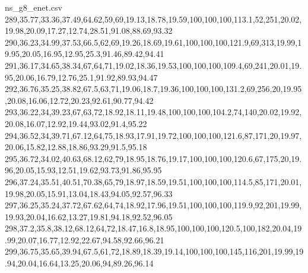 \begin{filecontents*}[overwrite]{ns_g8_enet.csv}
289,35.77,33.36,37.49,64.62,59,69,19.13,18.78,19.59,100,100,100,113.1,52,251,20.02,19.98,20.09,17.27,12.74,28.51,91.08,88.69,93.32
290,36.23,34.99,37.53,66.5,62,69,19.26,18.69,19.61,100,100,100,121.9,69,313,19.99,19.95,20.05,16.95,12.95,25.3,91.46,89.42,94.41
291,36.17,34.65,38.34,67,64,71,19.02,18.36,19.53,100,100,100,109.4,69,241,20.01,19.95,20.06,16.79,12.76,25.1,91.92,89.93,94.47
292,36.76,35.25,38.82,67.5,63,71,19.06,18.7,19.36,100,100,100,131.2,69,256,20,19.95,20.08,16.06,12.72,20.23,92.61,90.77,94.42
293,36.22,34,39.23,67,63,72,18.92,18.11,19.48,100,100,100,104.2,74,140,20.02,19.92,20.08,16.07,12.92,19.44,93.02,91.4,95.22
294,36.52,34,39.71,67.12,64,75,18.93,17.91,19.72,100,100,100,121.6,87,171,20,19.97,20.06,15.82,12.88,18.86,93.29,91.5,95.18
295,36.72,34.02,40.63,68.12,62,79,18.95,18.76,19.17,100,100,100,120.6,67,175,20,19.96,20.05,15.93,12.51,19.62,93.73,91.86,95.95
296,37.24,35.51,40.51,70.38,65,79,18.97,18.59,19.51,100,100,100,114.5,85,171,20.01,19.98,20.05,15.91,13.04,18.43,94.05,92.57,96.33
297,36.25,35.24,37.72,67.62,64,74,18.92,17.96,19.51,100,100,100,119.9,92,201,19.99,19.93,20.04,16.62,13.27,19.81,94.18,92.52,96.05
298,37.2,35.8,38.12,68.12,64,72,18.47,16.8,18.95,100,100,100,120.5,100,182,20.04,19.99,20.07,16.77,12.92,22.67,94.58,92.66,96.21
299,36.75,35.65,39.94,67.5,61,72,18.89,18.39,19.14,100,100,100,145,116,201,19.99,19.94,20.04,16.64,13.25,20.06,94,89.26,96.14
\end{filecontents*}

